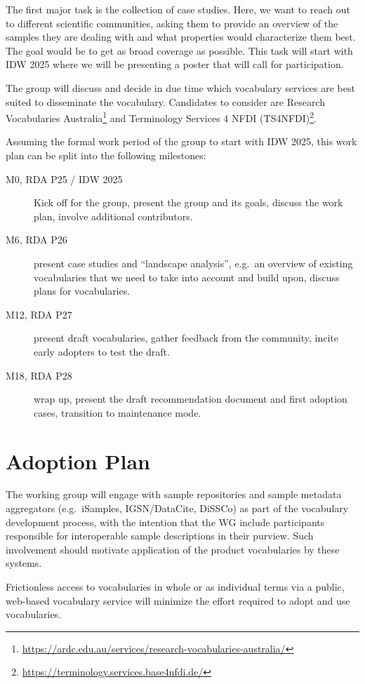 \documentclass{scrartcl}
\begin{document}
The first major task is the collection of case studies.  Here, we want
to reach out to different scientific communities, asking them to
provide an overview of the samples they are dealing with and what
properties would characterize them best.  The goal would be to get as
broad coverage as possible.  This task will start with IDW 2025 where
we will be presenting a poster that will call for participation.

The group will discuss and decide in due time which vocabulary
services are best suited to disseminate the vocabulary.  Candidates to
consider are Research Vocabularies
Australia\footnote{\url{https://ardc.edu.au/services/research-vocabularies-australia/}}
and Terminology Services 4 NFDI
(TS4NFDI)\footnote{\url{https://terminology.services.base4nfdi.de/}}.

Assuming the formal work period of the group to start with IDW 2025,
this work plan can be split into the following milestones:
\begin{description}
\item[M0, RDA P25 / IDW 2025] Kick off for the group, present the
  group and its goals, discuss the work plan, involve additional
  contributors.
\item[M6, RDA P26] present case studies and ``landscape analysis'',
  e.g.\ an overview of existing vocabularies that we need to take into
  account and build upon, discuss plans for vocabularies.
\item[M12, RDA P27] present draft vocabularies, gather feedback from
  the community, incite early adopters to test the draft.
\item[M18, RDA P28] wrap up, present the draft recommendation document
  and first adoption cases, transition to maintenance mode.
\end{description}

\section{Adoption Plan}

The working group will engage with sample repositories and sample
metadata aggregators (e.g.\ iSamples, IGSN/DataCite, DiSSCo) as part
of the vocabulary development process, with the intention that the WG
include participants responsible for interoperable sample descriptions
in their purview.  Such involvement should motivate application of the
product vocabularies by these systems.

Frictionless access to vocabularies in whole or as individual terms
via a public, web-based vocabulary service will minimize the effort
required to adopt and use vocabularies.
\end{document}
